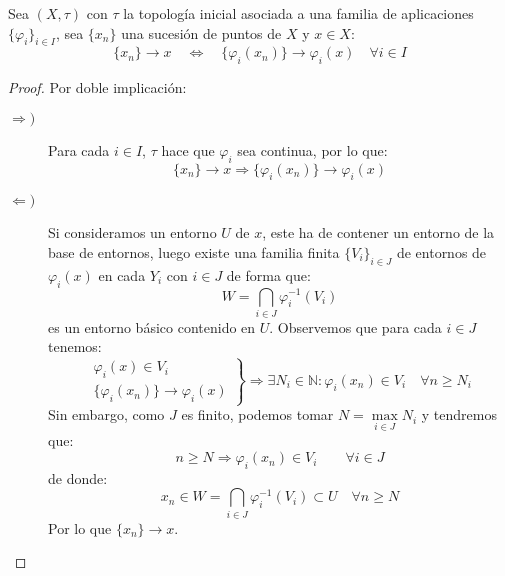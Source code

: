 \begin{prop}\label{prop:top_inicial_suc}
    Sea $(X,\tau)$ con $\tau$ la topología inicial asociada a una familia de aplicaciones $\{\varphi_i\}_{i \in I}$, sea $\{x_n\}$ una sucesión de puntos de $X$ y $x\in X$:
    \begin{equation*}
        \{x_n\}\to x \quad \Longleftrightarrow \quad  \{\varphi_i(x_n)\} \to \varphi_i(x) \quad \forall i \in I
    \end{equation*}
    \begin{proof}
        Por doble implicación:
        \begin{description}
            \item [$\Longrightarrow )$] Para cada $i \in I$, $\tau$ hace que $\varphi_i$ sea continua, por lo que:
                \begin{equation*}
                    \{x_n\} \to x \Longrightarrow \{\varphi_i(x_n)\} \to \varphi_i(x)
                \end{equation*}
            \item [$\Longleftarrow )$] Si consideramos un entorno $U$ de $x$, este ha de contener un entorno de la base de entornos, luego existe una familia finita $\{V_i\}_{i \in J}$ de entornos de $\varphi_i(x)$ en cada $Y_i$ con $i \in J$ de forma que:
                \begin{equation*}
                    W = \bigcap_{i \in J}\varphi_i^{-1}(V_i)
                \end{equation*}
                es un entorno básico contenido en $U$. Observemos que para cada $i \in J$ tenemos:
                \begin{equation*}
                    \left.\begin{array}{c}
                        \varphi_i(x) \in V_i \\
                        \{\varphi_i(x_n)\} \to \varphi_i(x)
                    \end{array}\right\} \Longrightarrow \exists N_i \in \mathbb{N} : \varphi_i(x_n)\in V_i \quad \forall n\geq N_i
                \end{equation*}
                Sin embargo, como $J$ es finito, podemos tomar $N = \max\limits_{i \in J}N_i$ y tendremos que:
                \begin{equation*}
                    n\geq N \Longrightarrow \varphi_i(x_n) \in V_i \qquad \forall i \in J
                \end{equation*}
                de donde:
                \begin{equation*}
                    x_n \in W = \bigcap_{i \in J}\varphi_i^{-1}(V_i) \subset U \quad \forall n\geq N
                \end{equation*}
                Por lo que $\{x_n\}\to x$.
        \end{description}
    \end{proof}
\end{prop}


